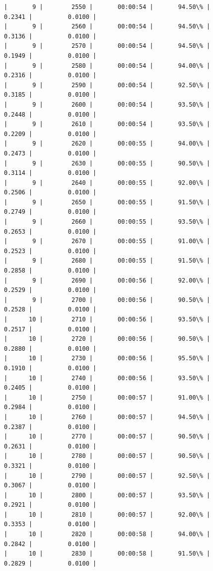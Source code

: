 \documentclass[11pt]{article}
\begin{document}
\begin{Verbatim}[commandchars=\\\{\}]
|       9 |        2550 |       00:00:54 |       94.50\% |       0.2341 |          0.0100 |
|       9 |        2560 |       00:00:54 |       94.50\% |       0.3136 |          0.0100 |
|       9 |        2570 |       00:00:54 |       94.50\% |       0.1949 |          0.0100 |
|       9 |        2580 |       00:00:54 |       94.00\% |       0.2316 |          0.0100 |
|       9 |        2590 |       00:00:54 |       92.50\% |       0.3185 |          0.0100 |
|       9 |        2600 |       00:00:54 |       93.50\% |       0.2448 |          0.0100 |
|       9 |        2610 |       00:00:54 |       93.50\% |       0.2209 |          0.0100 |
|       9 |        2620 |       00:00:55 |       94.00\% |       0.2473 |          0.0100 |
|       9 |        2630 |       00:00:55 |       90.50\% |       0.3114 |          0.0100 |
|       9 |        2640 |       00:00:55 |       92.00\% |       0.2506 |          0.0100 |
|       9 |        2650 |       00:00:55 |       91.50\% |       0.2749 |          0.0100 |
|       9 |        2660 |       00:00:55 |       93.50\% |       0.2653 |          0.0100 |
|       9 |        2670 |       00:00:55 |       91.00\% |       0.2523 |          0.0100 |
|       9 |        2680 |       00:00:55 |       91.50\% |       0.2858 |          0.0100 |
|       9 |        2690 |       00:00:56 |       92.00\% |       0.2529 |          0.0100 |
|       9 |        2700 |       00:00:56 |       90.50\% |       0.2528 |          0.0100 |
|      10 |        2710 |       00:00:56 |       93.50\% |       0.2517 |          0.0100 |
|      10 |        2720 |       00:00:56 |       90.50\% |       0.2880 |          0.0100 |
|      10 |        2730 |       00:00:56 |       95.50\% |       0.1910 |          0.0100 |
|      10 |        2740 |       00:00:56 |       93.50\% |       0.2405 |          0.0100 |
|      10 |        2750 |       00:00:57 |       91.00\% |       0.2984 |          0.0100 |
|      10 |        2760 |       00:00:57 |       94.50\% |       0.2387 |          0.0100 |
|      10 |        2770 |       00:00:57 |       90.50\% |       0.2631 |          0.0100 |
|      10 |        2780 |       00:00:57 |       90.50\% |       0.3321 |          0.0100 |
|      10 |        2790 |       00:00:57 |       92.50\% |       0.3067 |          0.0100 |
|      10 |        2800 |       00:00:57 |       93.50\% |       0.2921 |          0.0100 |
|      10 |        2810 |       00:00:57 |       92.00\% |       0.3353 |          0.0100 |
|      10 |        2820 |       00:00:58 |       94.00\% |       0.2842 |          0.0100 |
|      10 |        2830 |       00:00:58 |       91.50\% |       0.2829 |          0.0100 |

\end{Verbatim}
\end{document}
